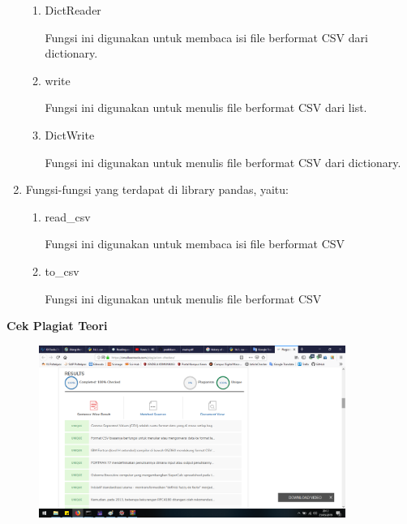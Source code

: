 \begin{enumerate}
\begin{enumerate}
		
		
		\item DictReader
		
		Fungsi ini digunakan untuk membaca isi file berformat CSV dari dictionary.
		
		
		
		\item write
		
		Fungsi ini digunakan untuk menulis file berformat CSV dari list.
		
		
		
		\item DictWrite
		
		Fungsi ini digunakan untuk menulis file berformat CSV dari dictionary.
		
		
		
	\end{enumerate}
	
	\item Fungsi-fungsi yang terdapat di library pandas, yaitu:
	\begin{enumerate}
		\item read\_csv
		
		Fungsi ini digunakan untuk membaca isi file berformat CSV
		
		
		
		\item to\_csv
		
		Fungsi ini digunakan untuk menulis file berformat CSV
		
		
		
	\end{enumerate}
\end{enumerate}

\textbf{Cek Plagiat Teori}

\begin{figure}[H]
	\includegraphics[width=10cm]{figures/diva/Chapter4/plagiat_teori.png}
	\centering
\end{figure}

